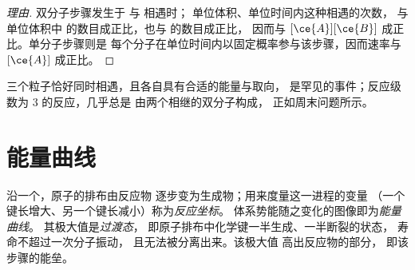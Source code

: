 \begin{proof}[理由]
双分子步骤发生于  与  相遇时；
单位体积、单位时间内这种相遇的次数，
与单位体积中  的数目成正比，也与  的数目成正比，
因而与 $[\ce{A}][\ce{B}]$ 成正比。单分子步骤则是
每个分子在单位时间内以固定概率参与该步骤，因而速率与 $[\ce{A}]$ 成正比。
\end{proof}

\begin{remark}[为何分子数很少超过二]\label{rem:b1:elementary-steps:termolecular}
三个粒子恰好同时相遇，且各自具有合适的能量与取向，
是罕见的事件；反应级数为 3 的反应，几乎总是
由两个相继的双分子构成，
正如周末问题所示。
\end{remark}

\section{能量曲线}

\begin{definition}\label{def:b1:elementary-steps:energy-profile}
沿一个，原子的排布由反应物
逐步变为生成物；用来度量这一进程的变量
（一个键长增大、另一个键长减小）称为\emph{反应坐标}。
体系势能随之变化的图像即为\emph{能量曲线}。
其极大值是\emph{过渡态}，
即原子排布中化学键一半生成、一半断裂的状态，
寿命不超过一次分子振动，
且无法被分离出来。该极大值
高出反应物的部分，
即该步骤的能垒。
\end{definition}

